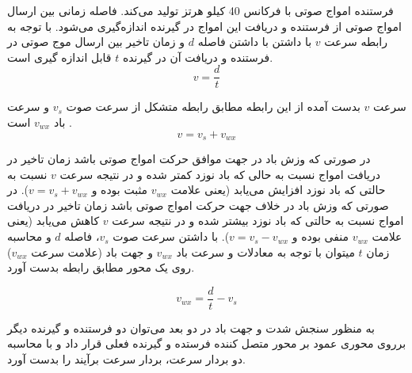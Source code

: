 فرستنده امواج صوتی با فرکانس 40 کیلو هرتز تولید می‌کند. فاصله زمانی بین ارسال امواج صوتی از فرستنده و دریافت این امواج در گیرنده اندازه‌گیری می‌شود. با توجه به رابطه  سرعت $v$ با داشتن با داشتن فاصله $d$ و زمان تاخیر بین ارسال موج صوتی در فرستنده و دریافت آن در گیرنده  $t$ قابل اندازه گیری است.
\begin{equation}\label{eq:speed}
	v = \frac{d}{t}
\end{equation}

سرعت $v$ بدست آمده از این رابطه مطابق رابطه  متشکل از سرعت صوت $v_s$ و سرعت باد $v_{wx}$  است .
\begin{equation}\label{eq:expandSpeed}
	v = v_s + v_{wx}
\end{equation}

در صورتی که وزش باد در جهت موافق حرکت امواج صوتی باشد زمان تاخیر در دریافت امواج نسبت به حالی که باد نوزد کمتر شده و در نتیجه سرعت $v$ نسبت به حالتی که باد نوزد افزایش می‌یابد (یعنی علامت $v_{wx}$ مثبت بوده و $v = v_s+v_{wx}$). در صورتی که وزش باد در خلاف جهت حرکت امواج صوتی باشد زمان تاخیر در دریافت امواج نسبت به حالتی که باد نوزد بیشتر شده و در نتیجه سرعت $v$ کاهش می‌یابد (یعنی علامت $v_{wx}$ منفی بوده و $v = v_s-v_{wx}$). با داشتن سرعت صوت $v_s$، فاصله $d$ و محاسبه زمان $t$ میتوان با توجه به معادلات  و  سرعت باد $v_{wx}$ و جهت باد (علامت سرعت $v_{wx}$) روی یک محور مطابق رابطه  بدست آورد. 

\begin{equation}\label{eq:speedWindX}
	v_{wx} = \frac{d}{t} - v_s
\end{equation}

به منظور سنجش شدت و جهت باد در دو بعد می‌توان دو فرستنده و گیرنده دیگر برروی محوری عمود بر محور متصل کننده فرستده و گیرنده فعلی قرار داد و با محاسبه دو بردار سرعت، بردار سرعت برآیند را بدست آورد.


